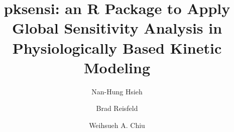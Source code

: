 \documentclass[preprint,12pt, a4paper]{elsarticle}
\begin{document}
\begin{frontmatter}



\title{pksensi: an R Package to Apply Global Sensitivity Analysis in
Physiologically Based Kinetic Modeling}


\author[1]{Nan-Hung Hsieh}
\author[2]{Brad Reisfeld}
\author[1]{Weihsueh A. Chiu}

\address[1]{
Veterinary Integrative Biosciences, College of Veterinary Medicine and
Biomedical Sciences, Texas A\&M University, College Station, TX, USA\\
}
\address[2]{
Chemical and Biological Engineering and School of Biomedical
Engineering, Colorado State University, Fort Collins, CO, USA\\
}



\end{frontmatter}
\end{document}
